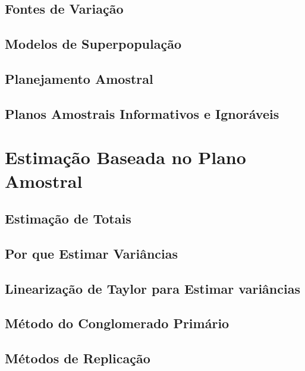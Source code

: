 \documentclass[]{book}
\theoremstyle{definition}
\theoremstyle{definition}
\theoremstyle{definition}
\theoremstyle{remark}
\begin{document}
\section{Fontes de Variação}\label{fontes-de-variacao}

\section{Modelos de Superpopulação}\label{modelos-de-superpopulacao}

\section{Planejamento Amostral}\label{planamo}

\section{Planos Amostrais Informativos e Ignoráveis}\label{inform}

\chapter{Estimação Baseada no Plano Amostral}\label{capplanamo}

\section{Estimação de Totais}\label{estimatotais}

\section{Por que Estimar Variâncias}\label{por-que-estimar-variancias}

\section{Linearização de Taylor para Estimar variâncias}\label{taylor}

\section{Método do Conglomerado
Primário}\label{metodo-do-conglomerado-primario}

\section{Métodos de Replicação}\label{metodos-de-replicacao}
\end{document}
